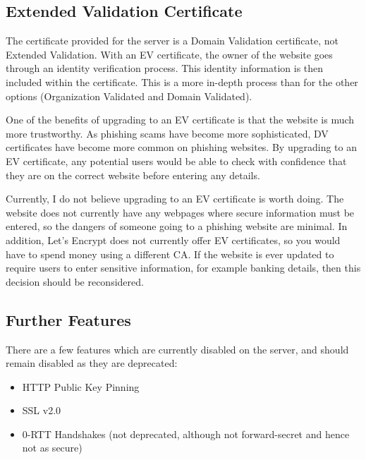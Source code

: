 \documentclass[12pt]{article}
\begin{document}
  \subsection{Extended Validation Certificate}
  The certificate provided for the server is a Domain Validation certificate, not Extended Validation.
  With an EV certificate, the owner of the website goes through an identity verification process.
  This identity information is then included within the certificate.
  This is a more in-depth process than for the other options (Organization Validated and Domain Validated).

  One of the benefits of upgrading to an EV certificate is that the website is much more trustworthy.
  As phishing scams have become more sophisticated, DV certificates have become more common on phishing websites.
  By upgrading to an EV certificate, any potential users would be able to check with confidence that they are on the correct website before entering any details.

  Currently, I do not believe upgrading to an EV certificate is worth doing.
  The website does not currently have any webpages where secure information must be entered, so the dangers of someone going to a phishing website are minimal.
  In addition, Let's Encrypt does not currently offer EV certificates, so you would have to spend money using a different CA.
  If the website is ever updated to require users to enter sensitive information, for example banking details, then this decision should be reconsidered.


  \subsection{Further Features}
  There are a few features which are currently disabled on the server, and should remain disabled as they are deprecated:
  \begin{itemize}
    \item HTTP Public Key Pinning
    \item SSL v2.0
    \item 0-RTT Handshakes (not deprecated, although not forward-secret and hence not as secure)
  \end{itemize}
\end{document}
